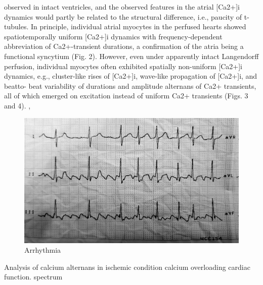 \documentclass[a4paper,12pt]{article}
\begin{document}
observed in intact ventricles, and the observed features in
the atrial [Ca2+]i dynamics would partly be related to the
structural difference, i.e., paucity of t-tubules.
In principle, individual atrial myocytes in the perfused
hearts showed spatiotemporally uniform [Ca2+]i dynamics
with frequency-dependent abbreviation of Ca2+-transient
durations, a confirmation of the atria being a functional
syncytium (Fig. 2). However, even under apparently intact
Langendorff perfusion, individual myocytes often exhibited
spatially non-uniform [Ca2+]i dynamics, e.g., cluster-like
rises of [Ca2+]i, wave-like propagation of [Ca2+]i, and beatto-
beat variability of durations and amplitude alternans of
Ca2+ transients, all of which emerged on excitation instead
of uniform Ca2+ transients (Figs. 3 and 4). \cite{jiang2014pacing}, \cite{aguirre2014intravital}

\begin{figure}
    \includegraphics[width=\linewidth]{fig0.jpg}
    \caption{Arrhythmia}
    \label{fig:fig0}
\end{figure}

Analysis of calcium alternans in ischemic condition
calcium overloading
cardiac function.
spectrum



\end{document}
